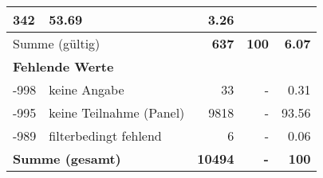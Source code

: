 \begin{longtable}{lXrrr}
       \num{342} &
       \num[round-mode=places,round-precision=2]{53,69} &
         \num[round-mode=places,round-precision=2]{3,26} \\
     \midrule
     \multicolumn{2}{l}{Summe (gültig)} &
       \textbf{\num{637}} &
     \textbf{100} &
       \textbf{\num[round-mode=places,round-precision=2]{6,07}} \\
     \multicolumn{5}{l}{\textbf{Fehlende Werte}}\\
       -998 &
       keine Angabe &
         \num{33} &
        - &
         \num[round-mode=places,round-precision=2]{0,31} \\
       -995 &
       keine Teilnahme (Panel) &
         \num{9818} &
        - &
         \num[round-mode=places,round-precision=2]{93,56} \\
       -989 &
       filterbedingt fehlend &
         \num{6} &
        - &
         \num[round-mode=places,round-precision=2]{0,06} \\
     \midrule
     \multicolumn{2}{l}{\textbf{Summe (gesamt)}} &
          \textbf{\num{10494}} &
        \textbf{-} &
        \textbf{100} \\
     \bottomrule
     \end{longtable}
     
